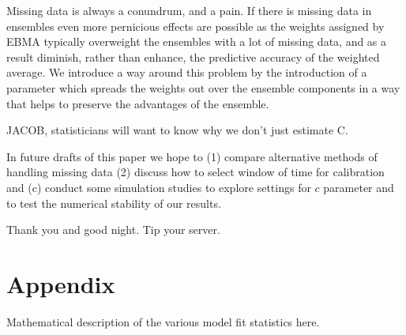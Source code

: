 \documentclass[12pt,fullpage,endnotes]{article}
\begin{document}
Missing data is always a conundrum, and a pain.  If there is missing data in ensembles even more pernicious effects are possible as the weights assigned by EBMA typically overweight the ensembles with a lot of missing data, and as a result diminish, rather than enhance, the predictive accuracy of the weighted average. We introduce a way around this problem by the introduction of a parameter which spreads the weights out over the ensemble components in a way that helps to preserve the advantages of the ensemble.  

JACOB, statisticians will want to know why we don't just estimate C.






In future drafts of this paper we hope to (1) compare alternative
methods of handling missing data (2) discuss how to select window of
time for calibration and (c) conduct some simulation studies to
explore settings for $c$ parameter and to test the numerical stability
of our results.

Thank you and good night. Tip your server.

 \newpage
 \appendix


 \section*{Appendix}

Mathematical description of the various model fit statistics here.  


\singlespacing


\end{document}
